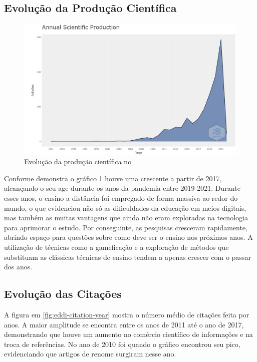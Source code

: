 \subsection{Evolução da Produção Científica}



\begin{figure}[ht]
    \centering
    \includegraphics[width=12cm]{experiments/MarcusABR/PesquisaBibliometrica/Imagens/newplot.png}
    \caption{Evolução da produção científica no \dataset\ }
    \label{fig:eddi-evolucao}
\end{figure}

Conforme demonstra o gráfico \ref{fig:eddi-evolucao} houve uma crescente a partir de 2017, alcançando o seu age durante os anos da pandemia entre 2019-2021. Durante esses anos, o ensino a distância foi empregado de forma massiva ao redor do mundo, o que evidenciou não só as dificuldades da educação em meios digitais, mas também as muitas vantagens que ainda não eram exploradas na tecnologia para aprimorar o estudo.
Por conseguinte, as pesquisas cresceram rapidamente, abrindo espaço para questões sobre como deve ser o ensino nos próximos anos. A utilização de técnicas como a gameficação e a exploração de métodos que substituam as clássicas técnicas de ensino tendem a apenas crescer com o passar dos anos.


\subsection{Evolução das Citações}


A figura em \ref{fig:eddi-citation-year} mostra o número médio de citações feita por anos. A maior amplitude se encontra entre os anos de 2011 até o ano de 2017, demonstrando que houve um aumento no comércio científico de informações e na troca de referências. No ano de 2010 foi quando o gráfico encontrou seu pico, evidenciando que artigos de renome surgiram nesse ano.

